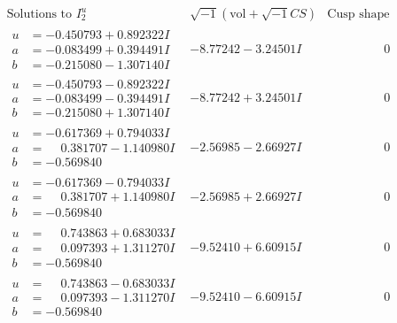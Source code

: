\documentclass[1p]{elsarticle_modified}
\theoremstyle{definition}
\newcommand{\I}{\sqrt{-1}}
\begin{document}
$$\begin{array}{c|c|c}  
\text{Solutions to }I^u_{2}& \I (\text{vol} + \sqrt{-1}CS) & \text{Cusp shape}\\
 \hline 
\begin{aligned}
u &= -0.450793 + 0.892322 I \\
a &= -0.083499 + 0.394491 I \\
b &= -0.215080 - 1.307140 I\end{aligned}
 & -8.77242 - 3.24501 I & \phantom{-0.000000 } 0 \\ \hline\begin{aligned}
u &= -0.450793 - 0.892322 I \\
a &= -0.083499 - 0.394491 I \\
b &= -0.215080 + 1.307140 I\end{aligned}
 & -8.77242 + 3.24501 I & \phantom{-0.000000 } 0 \\ \hline\begin{aligned}
u &= -0.617369 + 0.794033 I \\
a &= \phantom{-}0.381707 - 1.140980 I \\
b &= -0.569840\phantom{ +0.000000I}\end{aligned}
 & -2.56985 - 2.66927 I & \phantom{-0.000000 } 0 \\ \hline\begin{aligned}
u &= -0.617369 - 0.794033 I \\
a &= \phantom{-}0.381707 + 1.140980 I \\
b &= -0.569840\phantom{ +0.000000I}\end{aligned}
 & -2.56985 + 2.66927 I & \phantom{-0.000000 } 0 \\ \hline\begin{aligned}
u &= \phantom{-}0.743863 + 0.683033 I \\
a &= \phantom{-}0.097393 + 1.311270 I \\
b &= -0.569840\phantom{ +0.000000I}\end{aligned}
 & -9.52410 + 6.60915 I & \phantom{-0.000000 } 0 \\ \hline\begin{aligned}
u &= \phantom{-}0.743863 - 0.683033 I \\
a &= \phantom{-}0.097393 - 1.311270 I \\
b &= -0.569840\phantom{ +0.000000I}\end{aligned}
 & -9.52410 - 6.60915 I & \phantom{-0.000000 } 0 \\ \hline\begin{aligned}

\end{aligned}
\end{array}$$
\end{document}
